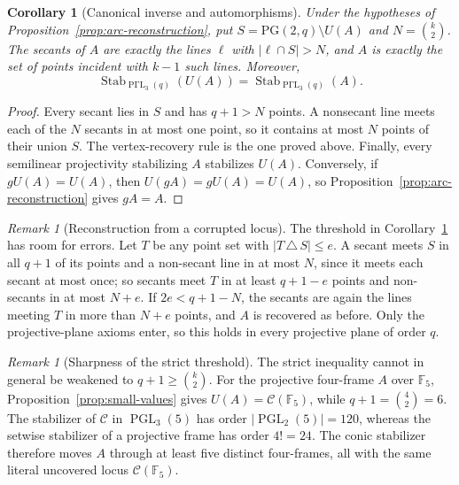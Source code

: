 \documentclass[11pt]{article}
\newtheorem{corollary}[theorem]{Corollary}
\theoremstyle{definition}
\theoremstyle{remark}
\newtheorem{remark}[theorem]{Remark}
\newcommand{\PG}{\mathrm{PG}}
\newcommand{\F}{\mathbb{F}}
\newcommand{\cC}{\mathcal{C}}
\begin{document}
\begin{corollary}[Canonical inverse and automorphisms]
\label{cor:arc-reconstruction-algorithm}
Under the hypotheses of Proposition~\ref{prop:arc-reconstruction}, put
$S=\PG(2,q)\setminus U(A)$ and $N=\binom{k}{2}$.  The secants of $A$ are
exactly the lines $\ell$ with $|\ell\cap S|>N$, and $A$ is exactly the set
of points incident with $k-1$ such lines.  Moreover,
\[
 \operatorname{Stab}_{\operatorname{P\Gamma L}_3(q)}(U(A))
 =
 \operatorname{Stab}_{\operatorname{P\Gamma L}_3(q)}(A).
\]
\end{corollary}

\begin{proof}
Every secant lies in $S$ and has $q+1>N$ points.  A nonsecant line meets
each of the $N$ secants in at most one point, so it contains at most $N$
points of their union $S$.  The vertex-recovery rule is the one proved
above.  Finally, every semilinear projectivity stabilizing $A$ stabilizes
$U(A)$.  Conversely, if $gU(A)=U(A)$, then
$U(gA)=gU(A)=U(A)$, so Proposition~\ref{prop:arc-reconstruction} gives
$gA=A$.
\end{proof}

\begin{remark}[Reconstruction from a corrupted locus]
\label{rem:noisy-reconstruction}
The threshold in Corollary~\ref{cor:arc-reconstruction-algorithm} has
room for errors.  Let $T$ be any point set with $|T\,\triangle\,S|\le e$.
A secant meets $S$ in all $q+1$ of its points and a non-secant line in at
most $N$, since it meets each secant at most once; so secants meet $T$ in
at least $q+1-e$ points and non-secants in at most $N+e$.  If
$2e<q+1-N$, the secants are again the lines meeting $T$ in more than
$N+e$ points, and $A$ is recovered as before.  Only the projective-plane
axioms enter, so this holds in every projective plane of order $q$.
\end{remark}

\begin{remark}[Sharpness of the strict threshold]
\label{rem:arc-reconstruction-sharp}
The strict inequality cannot in general be weakened to
$q+1\ge\binom{k}{2}$.  For the projective four-frame $A$ over $\F_5$,
Proposition~\ref{prop:small-values} gives $U(A)=\cC(\F_5)$, while
$q+1=\binom{4}{2}=6$.  The stabilizer of $\cC$ in
$\operatorname{PGL}_3(5)$ has order
$|\operatorname{PGL}_2(5)|=120$, whereas the setwise stabilizer of a
projective frame has order $4!=24$.  The conic stabilizer therefore moves
$A$ through at least five distinct four-frames, all with the same literal
uncovered locus $\cC(\F_5)$.
\end{remark}
\end{document}
